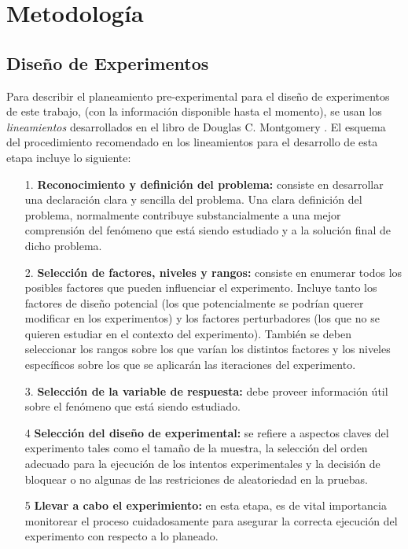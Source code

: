 \section{\textbf{Metodolog\'ia}}
\subsection{Dise\~no de Experimentos}
Para describir el planeamiento pre-experimental para el dise\~no de experimentos de este trabajo, (con la informaci\'on disponible hasta el momento), se usan los \textit{lineamientos} desarrollados en el libro de Douglas C. Montgomery \cite{montgomeryx}. El esquema del procedimiento recomendado en los lineamientos para el desarrollo de esta etapa incluye lo siguiente:
\begin{itemize}
\item [1.] \textbf{Reconocimiento y definici\'on del problema:} consiste en desarrollar una declaraci\'on clara y sencilla del problema. Una clara definici\'on del problema, normalmente contribuye substancialmente a una mejor comprensi\'on del fen\'omeno que est\'a siendo estudiado y a la soluci\'on final de dicho problema.
\item [2.] \textbf{Selecci\'on de factores, niveles y rangos:} consiste en enumerar todos los posibles factores que pueden influenciar el experimento. Incluye tanto los factores de dise\~no potencial (los que potencialmente se podr\'ian querer modificar en los experimentos) y los factores perturbadores (los que no se quieren estudiar en el contexto del experimento). Tambi\'en se deben seleccionar los rangos sobre los que var\'ian los distintos factores y los niveles espec\'ificos sobre los que se aplicar\'an las iteraciones del experimento.
\item [3.] \textbf{Selecci\'on de la variable de respuesta:} debe proveer informaci\'on \'util sobre el fen\'omeno que est\'a siendo estudiado.
\item [4] \textbf{Selecci\'on del dise\~no de experimental:} se refiere a aspectos claves del experimento tales como el tama\~no de la muestra, la selecci\'on del orden adecuado para la ejecuci\'on de los intentos experimentales y la decisi\'on de bloquear o no algunas de las restriciones de aleatoriedad en la pruebas.
\item [5] \textbf{Llevar a cabo el experimiento:} en esta etapa, es de vital importancia monitorear el proceso cuidadosamente para asegurar la correcta ejecuci\'on del experimento con respecto a lo planeado.
\end{itemize}
